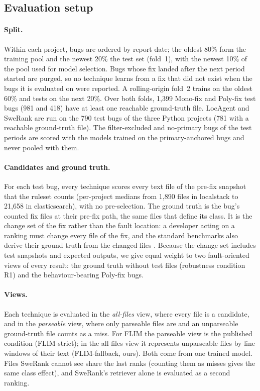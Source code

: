 \documentclass[a4paper,fleqn]{cas-dc}
\begin{document}
\subsection{Evaluation setup}\label{sec:evaluation}

\paragraph{Split.} Within each project, bugs are ordered by report date; the
oldest 80\% form the training pool and the newest 20\% the test set (fold~1),
with the newest 10\% of the pool used for model selection. Bugs whose fix
landed after the next period started are purged, so no technique learns from a
fix that did not exist when the bugs it is evaluated on were reported. A
rolling-origin fold~2 trains on the oldest 60\% and tests on the next 20\%.
Over both folds, 1{,}399 Mono-fix and Poly-fix test bugs (981 and 418) have at
least one reachable ground-truth file. LocAgent and SweRank are run on the 790
test bugs of the three Python projects (781 with a reachable ground-truth
file). The filter-excluded and no-primary bugs of the test periods are scored
with the models trained on the primary-anchored bugs and never pooled with
them.

\paragraph{Candidates and ground truth.} For each test bug, every technique
scores every text file of the pre-fix snapshot that the ruleset counts
(per-project medians from 1{,}890 files in localstack to 21{,}658 in
elasticsearch), with no pre-selection.
The ground truth is the bug's counted fix files at their pre-fix path, the
same files that define its class. It is the change set of the fix rather than
the fault location: a developer acting on a ranking must change every file of
the fix, and the standard benchmarks also derive their ground truth from the
changed files \citep{lee2018bench4bl,jimenez2023swe}. Because the change set
includes test snapshots and expected outputs, we give equal weight to two
fault-oriented views of every result: the ground truth without test files
(robustness condition R1) and the behaviour-bearing Poly-fix bugs.

\paragraph{Views.} Each technique is evaluated in the \emph{all-files} view,
where every file is a candidate, and in the \emph{parseable} view, where only
parseable files are and an unparseable ground-truth file counts as a miss.
For FLIM the parseable view is the published condition (FLIM-strict); in the
all-files view it represents unparseable files by line windows of their text
(FLIM-fallback, ours). Both come from one trained model. Files SweRank cannot
see share the last ranks (counting them as misses gives the same class
effect), and SweRank's retriever alone is evaluated as a second ranking.
\end{document}

